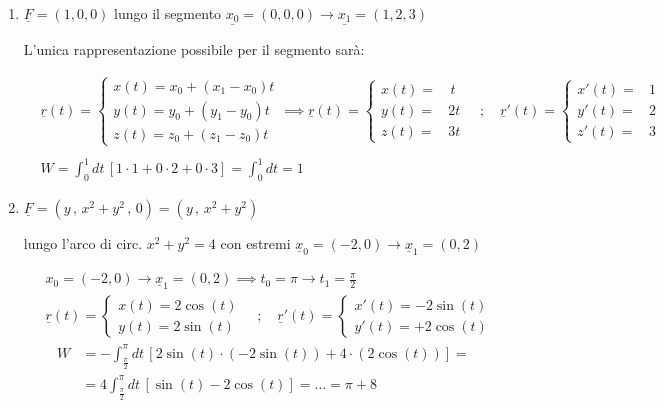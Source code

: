 \begin{enumerate}
	\item $\underline{F}=(1,0,0)$ lungo il segmento $\underline{x_0}=(0,0,0)\longrightarrow \underline{x_1}=(1,2,3)$
	
	L'unica rappresentazione possibile per il segmento sarà:
	
	\begin{align}
		{}&\underline{r}(t)=\left\{
		\begin{array}{ccc}
			x(t) = x_0 + (x_1 - x_0)t\\
			y(t) = y_0 + (y_1 - y_0)t\\
			z(t) = z_0 + (z_1 - z_0)t 
		\end{array}
		\right. \implies
		\underline{r}(t)=\left\{
		\begin{array}{ccc}
			x(t) ={}& \, t\\
			y(t) =& 2t\\
			z(t) =& 3t 
		\end{array}
		\right. \quad ; \quad
		\underline{r}'(t)=\left\{
		\begin{array}{ccc}
			x'(t) ={}& 1\\
			y'(t) =& 2\\
			z'(t) =& 3 
		\end{array}
		\right. \nonumber \\
		\nonumber\\
		&W=\int_{0}^{1} dt \, [1\cdot 1 + 0 \cdot 2 + 0 \cdot 3]= \int_{0}^{1}dt = 1
	\end{align}
	
	\newpage
	
	\item $\underline{F}=(y \, , \, x^2 + y^2\, , \, 0)=(y\, , \, x^2 + y^2)$ 
	
	lungo l'arco di circ. $x^2 + y^2=4$ con estremi   $\underline{x}_0=(-2,0) \longrightarrow \underline{x}_1=(0,2)$
	
	\begin{align}
		{}& {x}_0=(-2,0) \longrightarrow \underline{x}_1=(0,2) \implies t_0=\pi \longrightarrow t_1=\frac{\pi}{2}\\
		&\underline{r}(t)=\left\{
		\begin{array}{cc}
			x(t)=2\cos(t) \\
			y(t)=2\sin(t)
		\end{array}
		\right. \quad ; \quad
		\underline{r}'(t)=\left\{
		\begin{array}{cc}
			x'(t)=-2\sin(t) \\
			y'(t)=+2\cos(t)
		\end{array}
		\right.
	\end{align}
	\begin{align}
		W {}&= - \int_{\frac{\pi}{2}}^{\pi} dt \, [2\sin(t)\cdot (-2\sin(t)) + 4 \cdot (2\cos(t))] = \nonumber \\
		&=4 \int_{\frac{\pi}{2}}^{\pi} dt \, [\sin(t) -2\cos(t)]= \dots = \pi + 8
	\end{align}
	

\end{enumerate}
